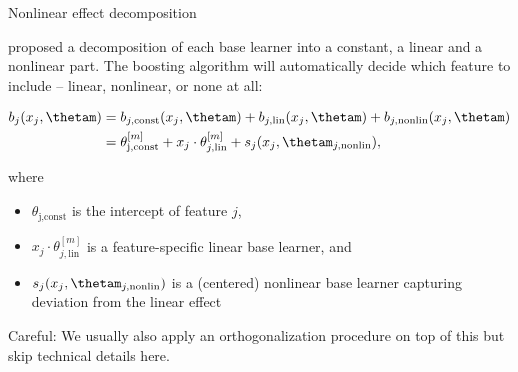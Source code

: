 \documentclass[11pt,compress,t,notes=noshow, xcolor=table]{beamer}
\begin{document}

%


\begin{vbframe}{Nonlinear effect decomposition}



proposed a decomposition of each base learner into a
constant, a linear and a nonlinear part.
The boosting algorithm will automatically decide which feature to include --
linear, nonlinear, or none at all:

\vspace{-0.7cm}

\begin{align*}
b_j(x_j, \thetam) & = b_{j, \text{const}}(x_j, \thetam) + b_{j, \text{lin}}
(x_j, \thetam) + b_{j, \text{nonlin}}(x_j, \thetam)\\
 & = \theta^{[m]}_\text{j,const} + x_j \cdot \theta^{[m]}_{j, \text{lin}} +
 s_j(x_j, \thetam_{j,\text{nonlin}}),
\end{align*}

\small
where
\begin{itemize}
  \small
  \item $\theta_\text{j,const}$ is the intercept of feature $j$,
  \item $x_j \cdot \theta^{[m]}_{j, \text{lin}}$ is a feature-specific linear
  base learner, and
  \item $s_j(x_j, \thetam_{j,\text{nonlin}})$ is a (centered) nonlinear base
  learner capturing deviation from the linear effect 
\end{itemize}

Careful: We usually also apply an orthogonalization procedure on top of this but skip technical details here. 


\end{vbframe}
\end{document}

